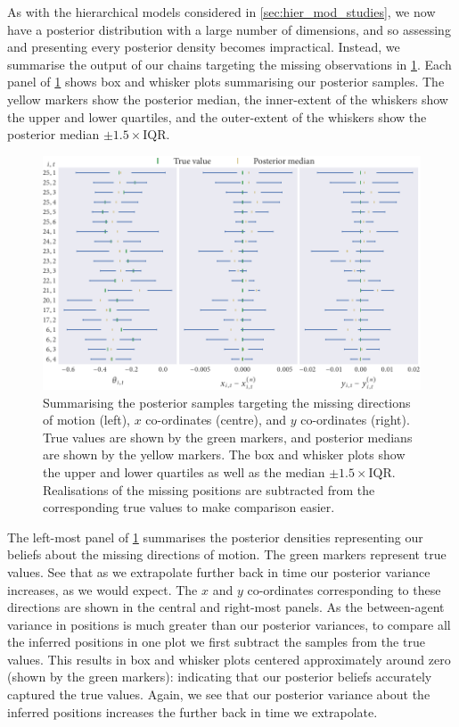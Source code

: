 As with the hierarchical models considered in \cref{sec:hier_mod_studies}, we
now have a posterior distribution with a large number of dimensions, and so
assessing and presenting every posterior density becomes impractical. Instead,
we summarise the output of our chains targeting the missing observations in
\cref{fig:beg_summary}. Each panel of \cref{fig:beg_summary} shows box and
whisker plots summarising our posterior samples. The yellow markers show the
posterior median, the inner-extent of the whiskers show the upper and lower
quartiles, and the outer-extent of the whiskers show the posterior median
$\pm1.5\times\text{IQR}$.

\begin{figure}[tbp]
  \includegraphics{beg/summary.pdf}
  \caption{Summarising the posterior samples targeting the missing directions
  of motion (left), $x$ co-ordinates (centre), and $y$ co-ordinates (right).
  True values are shown by the green markers, and posterior medians are shown
  by the yellow markers. The box and whisker plots show the upper and lower
  quartiles as well as the median $\pm1.5\times\text{IQR}$. Realisations of the
  missing positions are subtracted from the corresponding true values to make
  comparison easier.}
  \label{fig:beg_summary}
\end{figure}

The left-most panel of \cref{fig:beg_summary} summarises the posterior
densities representing our beliefs about the missing directions of motion. The
green markers represent true values. See that as we extrapolate further back in
time our posterior variance increases, as we would expect. The $x$ and $y$
co-ordinates corresponding to these directions are shown in the central and
right-most panels. As the between-agent variance in positions is much greater
than our posterior variances, to compare all the inferred positions in one plot
we first subtract the samples from the true values. This results in box and
whisker plots centered approximately around zero (shown by the green markers):
indicating that our posterior beliefs accurately captured the true values.
Again, we see that our posterior variance about the inferred positions
increases the further back in time we extrapolate.

